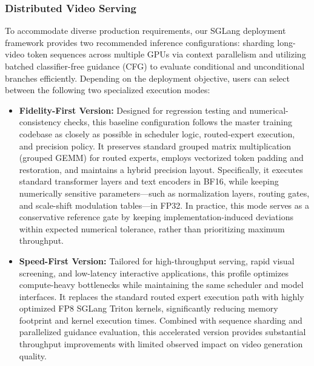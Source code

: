 \subsubsection{Distributed Video Serving}
To accommodate diverse production requirements, our SGLang deployment framework provides two recommended inference configurations: sharding long-video token sequences across multiple GPUs via context parallelism and utilizing batched classifier-free guidance (CFG) to evaluate conditional and unconditional branches efficiently.
Depending on the deployment objective, users can select between the following two specialized execution modes:
\begin{itemize}
    \item \textbf{Fidelity-First Version:} Designed for regression testing and numerical-consistency checks, this baseline configuration follows the master training codebase as closely as possible in scheduler logic, routed-expert execution, and precision policy. It preserves standard grouped matrix multiplication (grouped GEMM) for routed experts, employs vectorized token padding and restoration, and maintains a hybrid precision layout. Specifically, it executes standard transformer layers and text encoders in BF16, while keeping numerically sensitive parameters—such as normalization layers, routing gates, and scale-shift modulation tables—in FP32. In practice, this mode serves as a conservative reference gate by keeping implementation-induced deviations within expected numerical tolerance, rather than prioritizing maximum throughput.
    \item \textbf{Speed-First Version:} Tailored for high-throughput serving, rapid visual screening, and low-latency interactive applications, this profile optimizes compute-heavy bottlenecks while maintaining the same scheduler and model interfaces. It replaces the standard routed expert execution path with highly optimized FP8 SGLang Triton kernels, significantly reducing memory footprint and kernel execution times. Combined with sequence sharding and parallelized guidance evaluation, this accelerated version provides substantial throughput improvements with limited observed impact on video generation quality.
\end{itemize}
